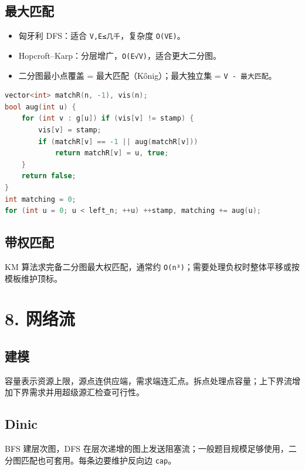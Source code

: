 \subsection{最大匹配}\label{ux6700ux5927ux5339ux914d}

\begin{itemize}
\tightlist
\item
  匈牙利 DFS：适合 \passthrough{\lstinline!V,E≤几千!}，复杂度 \passthrough{\lstinline!O(VE)!}。
\item
  Hopcroft--Karp：分层增广，\passthrough{\lstinline!O(E√V)!}，适合更大二分图。
\item
  二分图最小点覆盖 = 最大匹配（Kőnig）；最大独立集 = \passthrough{\lstinline!V - 最大匹配!}。
\end{itemize}

\begin{lstlisting}[language={C++}]
vector<int> matchR(n, -1), vis(n);
bool aug(int u) {
    for (int v : g[u]) if (vis[v] != stamp) {
        vis[v] = stamp;
        if (matchR[v] == -1 || aug(matchR[v]))
            return matchR[v] = u, true;
    }
    return false;
}
int matching = 0;
for (int u = 0; u < left_n; ++u) ++stamp, matching += aug(u);
\end{lstlisting}

\subsection{带权匹配}\label{ux5e26ux6743ux5339ux914d}

KM 算法求完备二分图最大权匹配，通常约 \passthrough{\lstinline!O(n³)!}；需要处理负权时整体平移或按模板维护顶标。

\section{8. 网络流}\label{ux7f51ux7edcux6d41}

\subsection{建模}\label{ux5efaux6a21}

容量表示资源上限，源点连供应端，需求端连汇点。拆点处理点容量；上下界流增加下界需求并用超级源汇检查可行性。

\subsection{Dinic}\label{dinic}

BFS 建层次图，DFS 在层次递增的图上发送阻塞流；一般题目规模足够使用，二分图匹配也可套用。每条边要维护反向边 \passthrough{\lstinline!cap!}。

